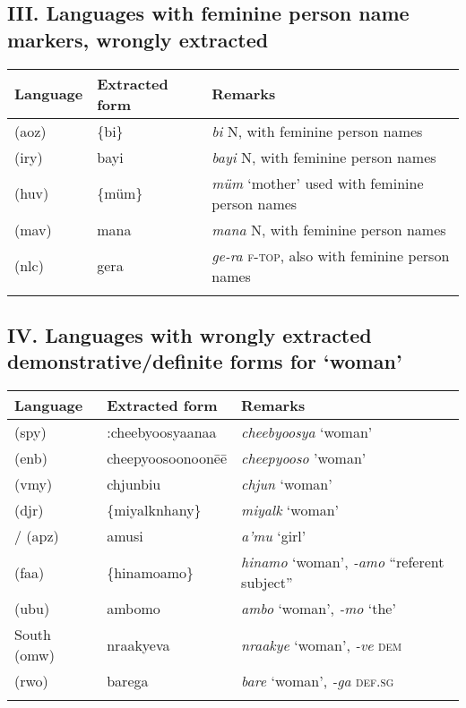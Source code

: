 \subsection*{III. Languages with feminine person name markers, wrongly extracted \normalfont [6 languages]}

\begin{tabularx}{\textwidth}{llQ}
\lsptoprule
 Language &  Extracted form &  Remarks \\
\midrule
{} (aoz)	&	\{bi\}	&	\textit{bi} N, with feminine person names	\\
 (iry)	&	bayi	&	\textit{bayi} N, with feminine person names	\\
 (huv)	&	\{müm\}	&	\textit{müm} ‘mother’ used with feminine person names 	\\
 (mav)	&	mana	&	\textit{mana} N, with feminine person names	\\
 (nlc)	&	gera	&	\textit{ge-ra} \textsc{f-top}, also with feminine person names	\\
\lspbottomrule
\end{tabularx}



\subsection*{IV. Languages with wrongly extracted demonstrative/definite forms for ‘woman’
\normalfont [9 languages]}

\begin{tabularx}{\textwidth}{llQ}
\lsptoprule
 Language &  Extracted form &  Remarks \\
\midrule
{} (spy)	&	:cheebyoosyaanaa	&	\textit{cheebyoosya} ‘woman’	\\
 (enb)	&	cheepyoosoonoonēē	&	\textit{cheepyooso} ’woman’	\\
 (vmy)	&	chjunbiu	&	\textit{chjun} ‘woman’	\\
 (djr)	&	\{miyalknhany\}	&	\textit{miyalk} ‘woman’	\\
/ (apz)	&	a\textquotesingle{}musi	&	\textit{a'mu} ‘girl’	\\
 (faa)	&	\{hinamoamo\}	&	\textit{hinamo} ‘woman’, \textit{-amo} “referent subject”	\\
 (ubu)	&	ambomo	&	\textit{ambo} ‘woman’, \textit{-mo} ‘the’	\\
South  (omw)	&	nraakyeva	&	\textit{nraakye} ‘woman’, \textit{-ve} \textsc{dem}	\\
 (rwo)	&	barega	&	\textit{bare} ‘woman’, \textit{-ga} \textsc{def.sg}	\\
\lspbottomrule
\end{tabularx}


